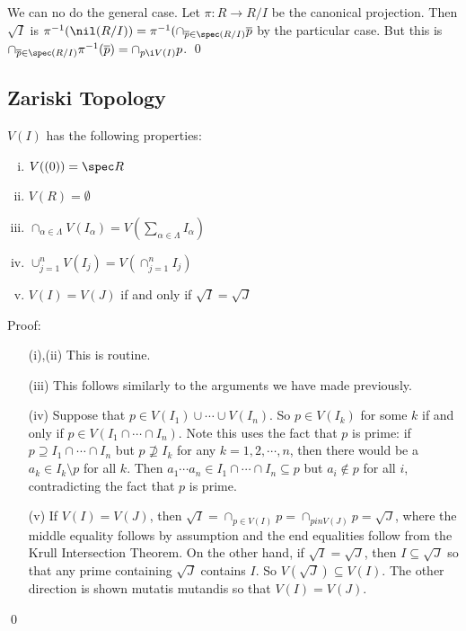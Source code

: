 We can no do the general case. Let $\pi: R \to R/I$ be the canonical projection. Then $\sqrt{I}$ is $\pi^{-1}(\nil(R/I))=\pi^{-1}(\cap_{\overline{p} \in \spec(R/I)} \overline{p}$ by the particular case. But this is $\cap_{\overline{p} \in \spec(R/I)} \pi^{-1}(\overline{p})=\cap_{p \i V(I)} p$. \qed \\

\subsection{Zariski Topology}

\begin{prop} $V(I)$ has the following properties:
\begin{enumerate}[(i)] 
\item $V((0))=\spec R$
\item $V(R)=\emptyset$
\item $\cap_{\alpha \in \Lambda} V(I_\alpha)=V\left(\sum_{\alpha \in \Lambda} I_\alpha\right)$
\item $\cup_{j=1}^n V(I_j)=V \left( \cap_{j=1}^n I_j \right)$
\item $V(I)=V(J)$ if and only if $\sqrt{I}=\sqrt{J}$
\end{enumerate}
\end{prop}

\noindent Proof:
\begin{enumerate}
\item[(i),(ii)] This is routine.
\item[(iii)] This follows similarly to the arguments we have made previously.
\item[(iv)] Suppose that $p \in V(I_1) \cup \cdots \cup V(I_n)$. So $p \in V(I_k)$ for some $k$ if and only if $p \in V(I_1 \cap \cdots \cap I_n)$. Note this uses the fact that $p$ is prime: if $p \supseteq I_1\cap \cdots \cap I_n$ but $p \not\supseteq I_k$ for any $k=1,2,\cdots,n$, then there would be a $a_k \in I_k \setminus p$ for all $k$. Then $a_1\cdots a_n \in I_1 \cap \cdots \cap I_n \subseteq p$ but $a_i \notin p$ for all $i$, contradicting the fact that $p$ is prime.
\item[(v)] If $V(I)=V(J)$, then $\sqrt{I}=\cap_{p \in V(I)} p = \cap_{p in V(J)} p = \sqrt{J}$, where the middle equality follows by assumption and the end equalities follow from the Krull Intersection Theorem. On the other hand, if $\sqrt{I}=\sqrt{J}$, then $I \subseteq \sqrt{J}$ so that any prime containing $\sqrt{J}$ contains $I$. So $V(\sqrt{J}) \subseteq V(I)$. The other direction is shown mutatis mutandis so that $V(I)=V(J)$.
\end{enumerate}
\qed \\

